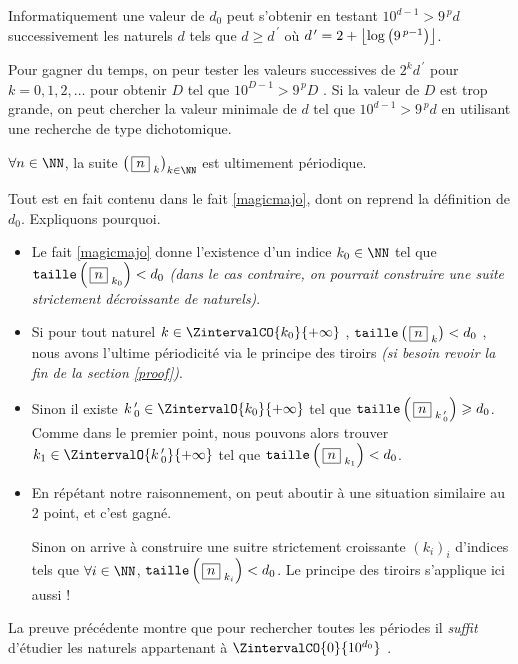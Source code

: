 \medskip

\begin{remark}
	Informatiquement une valeur de $d_0$ peut s'obtenir en testant $10^{d - 1} > 9^{\,p} d$ successivement les naturels $d$ tels que $d \geqslant d^{\,\prime}$ où $d^{\,\prime} = 2 + \left\lfloor  \log \left( 9^{\,p-1} \right) \right\rfloor$.
	
	\medskip
	
	Pour gagner du temps, on peur tester les valeurs successives de $2^k d^{\,\prime}$ pour $k = 0, 1, 2, \dots$ pour obtenir $D$ tel que $10^{D - 1} > 9^{\,p} D$ . Si la valeur de $D$ est trop grande, on peut chercher la valeur minimale de $d$ tel que $10^{d - 1} > 9^{\,p} d$ en utilisant une recherche de type dichotomique. 
\end{remark}


\medskip

\begin{fact}\label{beautifulproof}
	$\forall n \in \NN$, la suite $\left( \, \sqseq{n}{k} \right)_{k \in \NN}$ est ultimement périodique.
\end{fact}

\begin{proof*}
	Tout est en fait contenu dans le fait \ref{magicmajo}, dont on reprend la définition de $d_0$. Expliquons pourquoi.
	\begin{itemize}[label = \textbullet]
		\item Le fait \ref{magicmajo} donne l'existence d'un indice $k_0 \in \NN$ tel que $\operatorname{\text{\normalfont\texttt{taille}}}\left( \, \fbox{$n$}_{\,\,k_0} \right) < d_0$ \emph{(dans le cas contraire, on pourrait construire une suite strictement décroissante de naturels)}.

		\item Si pour tout naturel $k \in \ZintervalCO{k_0}{+\infty}$ , $\operatorname{\text{\normalfont\texttt{taille}}}\left( \, \fbox{$n$}_{\,\,k} \right) < d_0$ , nous avons l'ultime périodicité via le principe des tiroirs \emph{(si besoin revoir la fin de la section \ref{proof})}.

		\item Sinon il existe $k\,^\prime_0 \in \ZintervalO{k_0}{+\infty}$ tel que $\operatorname{\text{\normalfont\texttt{taille}}}\left( \, \fbox{$n$}_{\,\,k\,^\prime_0} \right) \geqslant d_0$. Comme dans le premier point, nous pouvons alors trouver $k_1 \in \ZintervalO{k\,^\prime_0}{+\infty}$ tel que $\operatorname{\text{\normalfont\texttt{taille}}}\left( \, \fbox{$n$}_{\,\,k_1} \right) < d_0$.
		
		\item En répétant notre raisonnement,
		on peut aboutir à une situation similaire au 2\ieme{} point, et c'est gagné. 
		
		\noindent
		Sinon on arrive à construire une suitre strictement croissante $\left( k_i \right)_i$ d'indices tels que $\forall i \in \NN$, $\operatorname{\text{\normalfont\texttt{taille}}}\left( \, \fbox{$n$}_{\,\,k_i} \right) < d_0$. Le principe des tiroirs s'applique ici aussi !
	\end{itemize}
\end{proof*}



\medskip

\begin{remark}
	La preuve précédente montre que pour rechercher toutes les périodes il \emph{\og suffit \fg} d'étudier les naturels appartenant à $\ZintervalCO{0}{10^{d_0}}$ .
\end{remark}
